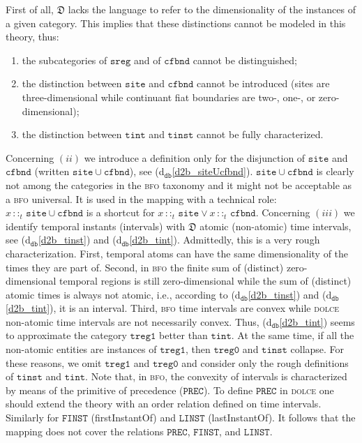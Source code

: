 \documentclass[ao]{iosart2x}
\newcommand{\nb}[1]{\textcolor{red}{$|$}\marginpar{\hspace*{-0cm}\parbox{20mm}{\scriptsize\raggedright\textcolor{red}{#1}}}}
\newcommand{\dbDefLabel}{\textrm{d$_\texttt{db}$}}
\newcommand{\refdbdf}[1]{({\dbDefLabel}\ref{#1})}
\newcommand{\pr}[1]{\mathtt{#1}}
\newcommand{\cn}[1]{\mathtt{#1}}
\newcommand{\dolce}{{\textsc{dolce}}}
\newcommand{\bfo}{{\textsc{bfo}}}
\newcommand {\thdolce} {\ensuremath{\mathfrak{D}}}
\newcommand{\sitebcat}{\cn{site}}
\newcommand{\cfbndbcat}{\cn{cfbnd}}
\newcommand{\sregbcat}{\cn{sreg}}
\newcommand{\tinstbcat}{\cn{tinst}}
\newcommand{\tintbcat}{\cn{tint}}
\newcommand{\onetregbcat}{\cn{treg1}}
\newcommand{\zerotregbcat}{\cn{treg0}}
\newcommand{\bfoiof}[1]{{\,::_{#1\:\!}}}
\begin{document}
First of all, {$\thdolce$} lacks the language to refer to the dimensionality of the instances of a given category. This implies that these distinctions cannot be modeled in this theory, thus: 
\begin{enumerate}[$(i)$]
\item the subcategories of $\sregbcat$ and of $\cfbndbcat$ cannot be distinguished; %
\item the distinction between $\sitebcat$ and $\cfbndbcat$ cannot be introduced (sites are three-dimensional while continuant fiat boundaries are two-, one-, or zero-dimensional); 
\item the distinction between $\tintbcat$ and $\tinstbcat$ cannot be fully characterized.
\end{enumerate} 

Concerning $(ii)$ we introduce a definition only for the disjunction of $\sitebcat$ and $\cfbndbcat$ (written $\sitebcat{\cup}\cfbndbcat$), see \refdbdf{d2b_siteUcfbnd}. $\sitebcat{\cup}\cfbndbcat$ is clearly not among the categories in the {\bfo} taxonomy and it might not be acceptable as a {\bfo} universal. It is used in the mapping with a technical role: $x \bfoiof{t} \sitebcat{\cup}\cfbndbcat$ is a shortcut for $x \bfoiof{t} \sitebcat \lor x \bfoiof{t}\cfbndbcat$. %
Concerning $(iii)$ we identify temporal instants (intervals) with $\thdolce$ atomic (non-atomic) time intervals, see \refdbdf{d2b_tinst} and \refdbdf{d2b_tint}. Admittedly, this is a very rough characterization. First, temporal atoms can have the same dimensionality of the times they are part of. Second, in {\bfo} the finite sum of (distinct) zero-dimensional temporal regions is still zero-dimensional while the sum of (distinct) atomic times is always not atomic, i.e., according to \refdbdf{d2b_tinst} and \refdbdf{d2b_tint}, {it is} an interval. Third, {\bfo} time intervals are convex while {\dolce} non-atomic time intervals are not necessarily convex. Thus, \refdbdf{d2b_tint} seems to approximate the category $\onetregbcat$ better than $\tintbcat$. At the same time, if all the non-atomic entities are instances of  $\onetregbcat$, then $\zerotregbcat$ and $\tinstbcat$ collapse. For these reasons, we omit $\onetregbcat$ and $\zerotregbcat$ and 
consider only the rough definitions of $\tinstbcat$ and $\tintbcat$. Note that, in {\bfo}, the convexity of intervals is characterized by means of the primitive of precedence ($\pr{PREC}$). To define $\pr{PREC}$ in {\dolce} one should extend the theory with an order relation defined on time intervals. Similarly for $\pr{FINST}$ (firstInstantOf) and $\pr{LINST}$ (lastInstantOf). It follows that the mapping does not cover the relations $\pr{PREC}$, $\pr{FINST}$, and $\pr{LINST}$.
\end{document}

